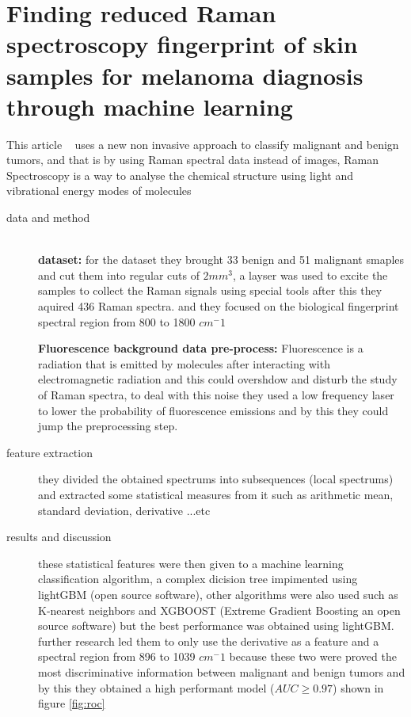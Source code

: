 
\section{Finding reduced Raman spectroscopy fingerprint of skin samples for melanoma diagnosis through machine learning}
    This article ~\cite{Daniella2021} uses a new non invasive approach to classify malignant and benign tumors, and that is by using Raman spectral data instead of images, Raman Spectroscopy is a way to analyse the chemical structure using light and vibrational energy modes of molecules ~\cite{Edinburgh}
\begin{description}
\item[data and method] \hfill \\
    
    \textbf{dataset: }
    for the dataset they brought 33 benign and 51 malignant smaples and cut them into regular cuts of $2mm^3$, a layser was used to excite the samples to collect the Raman signals using special tools after this they aquired 436 Raman spectra. and they focused on the biological fingerprint spectral region from 800 to 1800 $cm^-1$

    \textbf{Fluorescence background data pre-process: }
    Fluorescence is a radiation that is emitted by molecules after interacting with electromagnetic radiation and this could overshdow and disturb the study of Raman spectra, to deal with this noise they used a low frequency laser to lower the probability of fluorescence emissions and by this they could jump the preprocessing step.
\item[feature extraction]
    they divided the obtained spectrums into subsequences (local spectrums) and extracted some statistical measures from it such as arithmetic mean, standard deviation, derivative ...etc

\item[results and discussion]
    these statistical features were then given to a machine learning classification algorithm, a complex dicision tree impimented using lightGBM (open source software), other algorithms were also used such as K-nearest neighbors and XGBOOST (Extreme Gradient Boosting an open source software) but the best performance was obtained using lightGBM.
    further research led them to only use the derivative as a feature and a spectral region from 896 to 1039 $cm^-1$ because these two were proved the most discriminative information between malignant and benign tumors and by this they obtained a high performant model ($AUC \geq 0.97$) shown in figure \ref{fig:roc}
\end{description}

